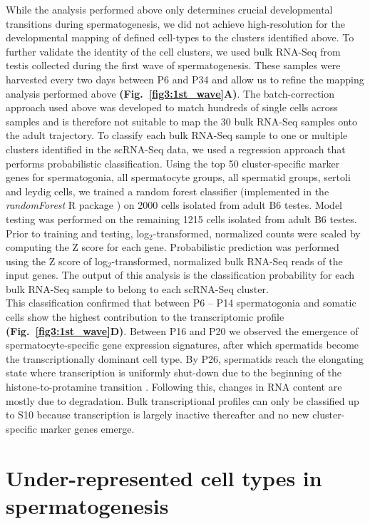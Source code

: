 While the analysis performed above only determines crucial developmental transitions during spermatogenesis, we did not achieve high-resolution for the developmental mapping of defined cell-types to the clusters identified above. To further validate the identity of the cell clusters, we used bulk RNA-Seq from testis collected during the first wave of spermatogenesis. These samples were harvested every two days between P6 and P34 and allow us to refine the mapping analysis performed above \textbf{(Fig.~\ref{fig3:1st_wave}A)}. The batch-correction approach used above was developed to match hundreds of single cells across samples and is therefore not suitable to map the 30 bulk RNA-Seq samples onto the adult trajectory. To classify each bulk RNA-Seq sample to one or multiple clusters identified in the scRNA-Seq data, we used a regression approach that performs probabilistic classification. Using the top 50 cluster-specific marker genes for spermatogonia, all spermatocyte groups, all spermatid groups, sertoli and leydig cells, we trained a random forest classifier (implemented in the \emph{randomForest} R package \citep{Liaw2002}) on 2000 cells isolated from adult B6 testes. Model testing was performed on the remaining 1215 cells isolated from adult B6 testes. Prior to training and testing, log$_2$-transformed, normalized counts were scaled by computing the Z score for each gene. Probabilistic prediction was performed using the Z score of log$_2$-transformed, normalized bulk RNA-Seq reads of the input genes. The output of this analysis is the classification probability for each bulk RNA-Seq sample to belong to each scRNA-Seq cluster.\\

This classification confirmed that between P6 – P14 spermatogonia and somatic cells show the highest contribution to the transcriptomic profile \textbf{(Fig.~\ref{fig3:1st_wave}D)}. Between P16 and P20 we observed the emergence of spermatocyte-specific gene expression signatures, after which spermatids become the transcriptionally dominant cell type. By P26, spermatids reach the elongating state where transcription is uniformly shut-down due to the beginning of the histone-to-protamine transition \citep{Steger1999}. Following this, changes in RNA content are mostly due to degradation. Bulk transcriptional profiles can only be classified up to S10 because transcription is largely inactive thereafter and no new cluster-specific marker genes emerge.  

\newpage

\section{Under-represented cell types in spermatogenesis}


